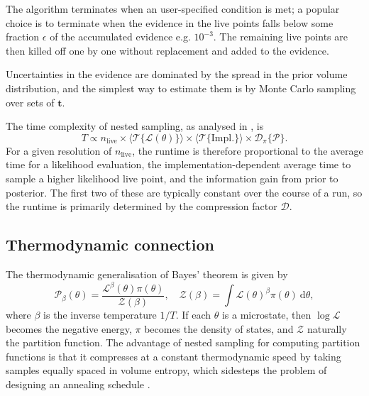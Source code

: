 \documentclass[usenatbib]{mnras}
\newcommand{\nlive}{n_\mathrm{live}}
\newcommand{\Like}{\mathcal{L}}
\begin{document}
The algorithm terminates when an user-specified condition is met; a popular choice is to terminate when the evidence in the live points falls below some fraction $\epsilon$ of the accumulated evidence e.g. $10^{-3}$. The remaining live points are then killed off one by one without replacement and added to the evidence.
\par
Uncertainties in the evidence are dominated by the spread in the prior volume distribution, and the simplest way to estimate them is by Monte Carlo sampling over sets of $\bm{t}$.
\par
The time complexity of nested sampling, as analysed in \citet{supernest}, is
\begin{equation}
    T \propto \nlive \times \langle \mathcal{T}\{ \Like(\theta) \} \rangle \times \langle \mathcal{T}\{ \mathrm{Impl.}\} \rangle \times \mathcal{D}_\pi \{ \mathcal{P} \}.
\end{equation}
For a given resolution of $\nlive$, the runtime is therefore proportional to the average time for a likelihood evaluation, the implementation-dependent average time to sample a higher likelihood live point, and the information gain from prior to posterior. The first two of these are typically constant over the course of a run, so the runtime is primarily determined by the compression factor $\mathcal{D}$.

\subsection{Thermodynamic connection}\label{sec:thermodynamic}
The thermodynamic generalisation of Bayes' theorem is given by
\begin{equation}\label{eq:thermo_bayes}
    \mathcal{P}_\beta(\theta) = \frac{\mathcal{L}^{\beta}(\theta) \pi(\theta)}{\mathcal{Z}(\beta)},
    \quad
    \mathcal{Z}(\beta) = \int \mathcal{L}(\theta)^\beta \pi(\theta)\ \mathrm{d}\theta,
\end{equation}
where $\beta$ is the inverse temperature $1/T$. If each $\theta$ is a microstate, then $\log \mathcal{L}$ becomes the negative energy, $\pi$ becomes the density of states, and $\mathcal{Z}$ naturally the partition function. The advantage of nested sampling for computing partition functions is that it compresses at a constant thermodynamic speed by taking samples equally spaced in volume entropy, which sidesteps the problem of designing an annealing schedule \citep{statmech}.  
\end{document}
